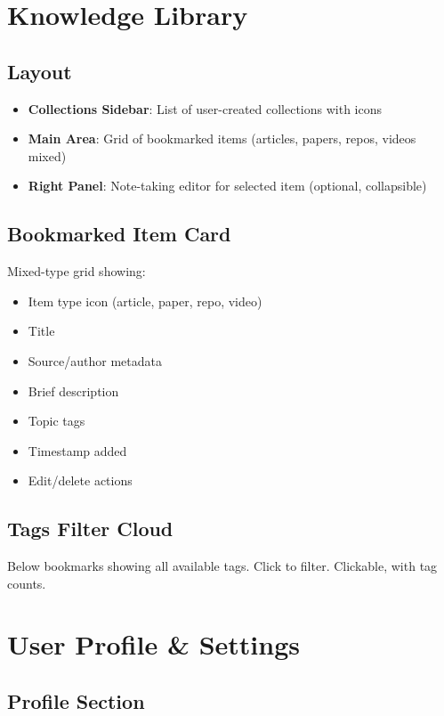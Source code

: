 \documentclass{report}
\begin{document}
\section{Knowledge Library}

\subsection{Layout}

\begin{itemize}
    \item \textbf{Collections Sidebar}: List of user-created collections with icons
    \item \textbf{Main Area}: Grid of bookmarked items (articles, papers, repos, videos mixed)
    \item \textbf{Right Panel}: Note-taking editor for selected item (optional, collapsible)
\end{itemize}

\subsection{Bookmarked Item Card}

Mixed-type grid showing:
\begin{itemize}
    \item Item type icon (article, paper, repo, video)
    \item Title
    \item Source/author metadata
    \item Brief description
    \item Topic tags
    \item Timestamp added
    \item Edit/delete actions
\end{itemize}

\subsection{Tags Filter Cloud}

Below bookmarks showing all available tags. Click to filter. Clickable, with tag counts.


\section{User Profile \& Settings}

\subsection{Profile Section}
\end{document}
